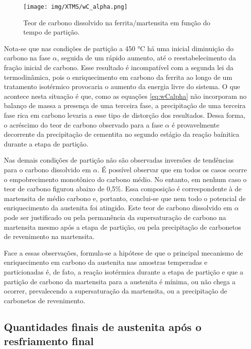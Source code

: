 \begin{figure}
	\texttt{[image: img/XTMS/wC\_alpha.png]}
	\caption{Teor de carbono dissolvido na ferrita/martensita em função do tempo de partição.}
	\label{fig:wCalpha}
\end{figure}

Nota-se que nas condições de partição a 450 °C há uma inicial diminuição do carbono na fase $\alpha$, seguida de um rápido aumento, até o reestabelecimento da fração inicial de carbono. Esse resultado é incompatível com a segunda lei da termodinâmica, pois o enriquecimento em carbono da ferrita ao longo de um tratamento isotérmico provocaria o aumento da energia livre do sistema. O que acontece nesta situação é que, como as equações \ref{eq:wCalpha} não incorporam no balanço de massa a presença de uma terceira fase, a precipitação de uma terceira fase rica em carbono levaria a esse tipo de distorção dos resultados. Dessa forma, o acréscimo do teor de carbono observado para a fase $\alpha$ é provavelmente decorrente da precipitação de cementita no segundo estágio da reação baínitica durante a etapa de partição.

Nas demais condições de partição não são observadas inversões de tendências para o carbono dissolvido em $\alpha$. É possível observar que em todos os casos ocorre o empobrecimento monotônico do carbono médio. No entanto, em nenhum caso o teor de carbono figurou abaixo de 0,5\%. Essa composição é correspondente à de martensita de médio carbono e, portanto, conclui-se que nem todo o potencial de enriquecimento da austenita foi atingido. Este teor de carbono dissolvido em $\alpha$ pode ser justificado ou pela permanência da supersaturação de carbono na martensita mesmo após a etapa de partição, ou pela precipitação de carbonetos de revenimento na martensita.

Face a essas observações, formula-se a hipótese de que o principal mecanismo de enriquecimento em carbono da austenita nas amostras temperadas e particionadas é, de fato, a reação isotérmica durante a etapa de partição e que a partição de carbono da martensita para a austenita é mínima, ou não chega a ocorrer, prevalecendo a supersaturação da martensita, ou a precipitação de carbonetos de revenimento.

\subsection{Quantidades finais de austenita após o resfriamento final}


